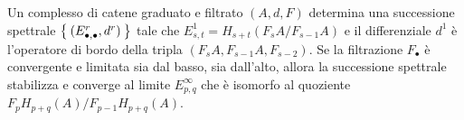 



\begin{thm}
	Un complesso di catene graduato e filtrato $(A,d,F)$ determina una successione spettrale
	$\Set{(E_{\bullet,\bullet}^{r},d^{r})}$ tale che
	$E_{s,t}^{1} = H_{s+t}(F_{s}A/F_{s-1}A)$ e il differenziale $d^{1}$ è
	l'operatore di bordo della tripla $(F_{s}A,F_{s-1}A,F_{s-2})$.
	Se la filtrazione $F_{\bullet}$ è convergente e limitata sia dal basso, sia dall'alto,
	allora la successione spettrale stabilizza e converge al limite $E^{\infty}_{p,q}$
	che è isomorfo al quoziente $F_{p}H_{p+q}(A)/F_{p-1}H_{p+q}(A)$.
\end{thm}








